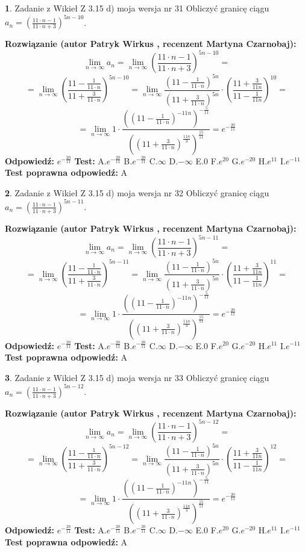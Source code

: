 \documentclass[12pt, a4paper]{article}
\theoremstyle{definition} %
\newtheorem{zad}{}
\newcommand{\zadStart}[1]{\begin{zad}#1\newline}
\newcommand{\zadStop}{\end{zad}}
\newcommand{\rozwStart}[2]{\noindent \textbf{Rozwiązanie (autor #1 , recenzent #2): }\newline}
\newcommand{\rozwStop}{\newline}
\newcommand{\odpStart}{\noindent \textbf{Odpowiedź:}\newline}
\newcommand{\odpStop}{\newline}
\newcommand{\testStart}{\noindent \textbf{Test:}\newline}
\newcommand{\testStop}{\newline}
\newcommand{\kluczStart}{\noindent \textbf{Test poprawna odpowiedź:}\newline}
\newcommand{\kluczStop}{\newline}
\begin{document}
\zadStart{Zadanie z Wikieł Z 3.15 d) moja wersja nr 31}
Obliczyć granicę ciągu $a_{n}=(\frac{11\cdot n - 1}{11 \cdot n + 3})^{5n-10}$.
\zadStop
\rozwStart{Patryk Wirkus}{Martyna Czarnobaj}
$$\lim\limits_{n\to\infty} a_{n} = \lim\limits_{n\to\infty}(\frac{11\cdot n - 1}{11 \cdot n + 3})^{5n-10}=$$
$$=\lim\limits_{n\to\infty}(\frac{11 - \frac{1}{11\cdot n}}{11 + \frac{3}{11 \cdot n}})^{5n-10}=\lim\limits_{n\to\infty}\frac{(11 - \frac{1}{11\cdot n})^{5n}}{(11 + \frac{3}{11\cdot n})^{5n}} \cdot (\frac{11+\frac{3}{11n}}{11-\frac{1}{11n}})^{10}=$$
$$=\lim\limits_{n\to\infty} 1 \cdot \frac{((11-\frac{1}{11 \cdot n})^{-11n})^{-\frac{5}{11}}}{((11+\frac{3}{11 \cdot n})^{\frac{11n}{3}})^{\frac{15}{11}}} =e^{-\frac{20}{11}}$$
\rozwStop
\odpStart
$e^{-\frac{20}{11}}$
\odpStop
\testStart
A.$ e^{-\frac{20}{11}}$
B.$ e^{-\frac{20}{11}}$
C.$\infty$
D.$-\infty$
E.$0$
F.$e^{20}$
G.$e^{-20}$
H.$e^{11}$
I.$e^{-11}$
\testStop
\kluczStart
A
\kluczStop



\zadStart{Zadanie z Wikieł Z 3.15 d) moja wersja nr 32}
Obliczyć granicę ciągu $a_{n}=(\frac{11\cdot n - 1}{11 \cdot n + 3})^{5n-11}$.
\zadStop
\rozwStart{Patryk Wirkus}{Martyna Czarnobaj}
$$\lim\limits_{n\to\infty} a_{n} = \lim\limits_{n\to\infty}(\frac{11\cdot n - 1}{11 \cdot n + 3})^{5n-11}=$$
$$=\lim\limits_{n\to\infty}(\frac{11 - \frac{1}{11\cdot n}}{11 + \frac{3}{11 \cdot n}})^{5n-11}=\lim\limits_{n\to\infty}\frac{(11 - \frac{1}{11\cdot n})^{5n}}{(11 + \frac{3}{11\cdot n})^{5n}} \cdot (\frac{11+\frac{3}{11n}}{11-\frac{1}{11n}})^{11}=$$
$$=\lim\limits_{n\to\infty} 1 \cdot \frac{((11-\frac{1}{11 \cdot n})^{-11n})^{-\frac{5}{11}}}{((11+\frac{3}{11 \cdot n})^{\frac{11n}{3}})^{\frac{15}{11}}} =e^{-\frac{20}{11}}$$
\rozwStop
\odpStart
$e^{-\frac{20}{11}}$
\odpStop
\testStart
A.$ e^{-\frac{20}{11}}$
B.$ e^{-\frac{20}{11}}$
C.$\infty$
D.$-\infty$
E.$0$
F.$e^{20}$
G.$e^{-20}$
H.$e^{11}$
I.$e^{-11}$
\testStop
\kluczStart
A
\kluczStop



\zadStart{Zadanie z Wikieł Z 3.15 d) moja wersja nr 33}
Obliczyć granicę ciągu $a_{n}=(\frac{11\cdot n - 1}{11 \cdot n + 3})^{5n-12}$.
\zadStop
\rozwStart{Patryk Wirkus}{Martyna Czarnobaj}
$$\lim\limits_{n\to\infty} a_{n} = \lim\limits_{n\to\infty}(\frac{11\cdot n - 1}{11 \cdot n + 3})^{5n-12}=$$
$$=\lim\limits_{n\to\infty}(\frac{11 - \frac{1}{11\cdot n}}{11 + \frac{3}{11 \cdot n}})^{5n-12}=\lim\limits_{n\to\infty}\frac{(11 - \frac{1}{11\cdot n})^{5n}}{(11 + \frac{3}{11\cdot n})^{5n}} \cdot (\frac{11+\frac{3}{11n}}{11-\frac{1}{11n}})^{12}=$$
$$=\lim\limits_{n\to\infty} 1 \cdot \frac{((11-\frac{1}{11 \cdot n})^{-11n})^{-\frac{5}{11}}}{((11+\frac{3}{11 \cdot n})^{\frac{11n}{3}})^{\frac{15}{11}}} =e^{-\frac{20}{11}}$$
\rozwStop
\odpStart
$e^{-\frac{20}{11}}$
\odpStop
\testStart
A.$ e^{-\frac{20}{11}}$
B.$ e^{-\frac{20}{11}}$
C.$\infty$
D.$-\infty$
E.$0$
F.$e^{20}$
G.$e^{-20}$
H.$e^{11}$
I.$e^{-11}$
\testStop
\kluczStart
A
\kluczStop
\end{document}
